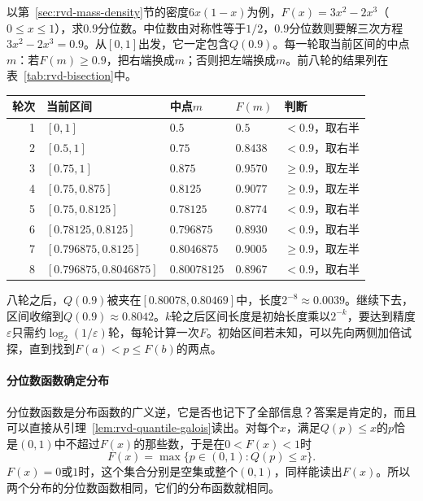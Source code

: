 以第~\ref{sec:rvd-mass-density}节的密度$6x(1-x)$为例，$F(x)=3x^{2}-2x^{3}$（$0\leq x\leq1$），求$0.9$分位数。中位数由对称性等于$1/2$，$0.9$分位数则要解三次方程$3x^{2}-2x^{3}=0.9$。从$[0,1]$出发，它一定包含$Q(0.9)$。每一轮取当前区间的中点$m$：若$F(m)\geq0.9$，把右端换成$m$；否则把左端换成$m$。前八轮的结果列在表~\ref{tab:rvd-bisection}中。

\begin{BookInlineTable}
  \centering
  \begin{tabular}{rllll}
    \toprule
    轮次 & 当前区间 & 中点$m$ & $F(m)$ & 判断\\
    \midrule
    1 & $[0,1]$ & $0.5$ & $0.5$ & $<0.9$，取右半\\
    2 & $[0.5,1]$ & $0.75$ & $0.8438$ & $<0.9$，取右半\\
    3 & $[0.75,1]$ & $0.875$ & $0.9570$ & $\geq0.9$，取左半\\
    4 & $[0.75,0.875]$ & $0.8125$ & $0.9077$ & $\geq0.9$，取左半\\
    5 & $[0.75,0.8125]$ & $0.78125$ & $0.8774$ & $<0.9$，取右半\\
    6 & $[0.78125,0.8125]$ & $0.796875$ & $0.8930$ & $<0.9$，取右半\\
    7 & $[0.796875,0.8125]$ & $0.8046875$ & $0.9005$ & $\geq0.9$，取左半\\
    8 & $[0.796875,0.8046875]$ & $0.80078125$ & $0.8967$ & $<0.9$，取右半\\
    \bottomrule
  \end{tabular}
  \caption{用二分法求$F(x)=3x^{2}-2x^{3}$的$0.9$分位数。每一轮区间长度减半，八轮后区间为$[0.80078125,0.8046875]$，长度$2^{-8}$。}
  \label{tab:rvd-bisection}
\end{BookInlineTable}

八轮之后，$Q(0.9)$被夹在$[0.80078,0.80469]$中，长度$2^{-8}\approx0.0039$。继续下去，区间收缩到$Q(0.9)\approx0.8042$。$k$轮之后区间长度是初始长度乘以$2^{-k}$，要达到精度$\varepsilon$只需约$\log_2(1/\varepsilon)$轮，每轮计算一次$F$。初始区间若未知，可以先向两侧加倍试探，直到找到$F(a)<p\leq F(b)$的两点。

\paragraph{分位数函数确定分布}
分位数函数是分布函数的广义逆，它是否也记下了全部信息？答案是肯定的，而且可以直接从引理~\ref{lem:rvd-quantile-galois}读出。对每个$x$，满足$Q(p)\leq x$的$p$恰是$(0,1)$中不超过$F(x)$的那些数，于是在$0<F(x)<1$时
\[
  F(x)=\max\{p\in(0,1):Q(p)\leq x\}.
\]
$F(x)=0$或$1$时，这个集合分别是空集或整个$(0,1)$，同样能读出$F(x)$。所以两个分布的分位数函数相同，它们的分布函数就相同。

